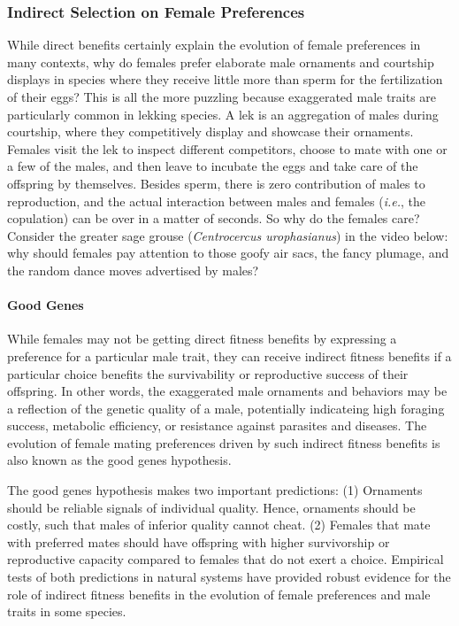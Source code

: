 \documentclass[
]{book}
\begin{document}
\hypertarget{indirect-selection-on-female-preferences}{%
\subsubsection*{Indirect Selection on Female Preferences}\label{indirect-selection-on-female-preferences}}

While direct benefits certainly explain the evolution of female preferences in many contexts, why do females prefer elaborate male ornaments and courtship displays in species where they receive little more than sperm for the fertilization of their eggs? This is all the more puzzling because exaggerated male traits are particularly common in lekking species. A lek is an aggregation of males during courtship, where they competitively display and showcase their ornaments. Females visit the lek to inspect different competitors, choose to mate with one or a few of the males, and then leave to incubate the eggs and take care of the offspring by themselves. Besides sperm, there is zero contribution of males to reproduction, and the actual interaction between males and females (\emph{i.e.}, the copulation) can be over in a matter of seconds. So why do the females care? Consider the greater sage grouse (\emph{Centrocercus urophasianus}) in the video below: why should females pay attention to those goofy air sacs, the fancy plumage, and the random dance moves advertised by males?

\hypertarget{good-genes}{%
\paragraph*{Good Genes}\label{good-genes}}

While females may not be getting direct fitness benefits by expressing a preference for a particular male trait, they can receive indirect fitness benefits if a particular choice benefits the survivability or reproductive success of their offspring. In other words, the exaggerated male ornaments and behaviors may be a reflection of the genetic quality of a male, potentially indicateing high foraging success, metabolic efficiency, or resistance against parasites and diseases. The evolution of female mating preferences driven by such indirect fitness benefits is also known as the good genes hypothesis.

The good genes hypothesis makes two important predictions: (1) Ornaments should be reliable signals of individual quality. Hence, ornaments should be costly, such that males of inferior quality cannot cheat. (2) Females that mate with preferred mates should have offspring with higher survivorship or reproductive capacity compared to females that do not exert a choice. Empirical tests of both predictions in natural systems have provided robust evidence for the role of indirect fitness benefits in the evolution of female preferences and male traits in some species.
\end{document}

